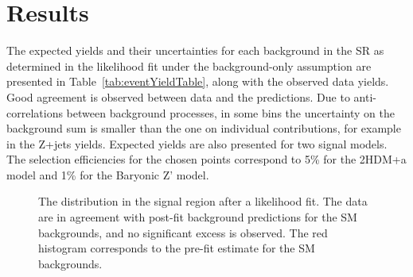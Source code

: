 \section{Results}

The expected yields and their uncertainties for each background in the SR as determined in the likelihood fit under the background-only assumption are presented in Table~\ref{tab:eventYieldTable}, along with the observed data yields.
Good agreement is observed between data and the predictions. Due to anti-correlations between background processes, in some bins the uncertainty on the background sum is smaller than the one on individual contributions, for example in the Z+jets yields. Expected yields are also presented for two signal models. The selection efficiencies for the chosen points correspond to 5\% for the 2HDM+a model and 1\% for the Baryonic Z' model. %
\begin{figure}
\centering
\caption{The \MET distribution in the signal region after a likelihood fit. The data are in agreement with post-fit background predictions for the SM backgrounds, and no significant excess is observed. The red histogram corresponds to the pre-fit estimate for the SM backgrounds.}
\label{Fig_sr}
\end{figure}

